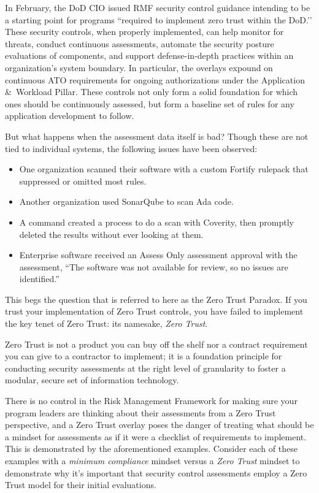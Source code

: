In February, the DoD CIO issued RMF security control guidance intending to be a starting point for programs ``required to implement zero trust within the DoD.’’\autocite[\pno~2]{20240610:cio} These security controls, when properly implemented, can help monitor for threats, conduct continuous assessments, automate the security posture evaluations of components, and support defense-in-depth practices within an organization's system boundary. In particular, the overlays expound on continuous ATO requirements for ongoing authorizations under the Application \&\ Workload Pillar. These controls not only form a solid foundation for which ones should be continuously assessed, but form a baseline set of rules for any application development to follow.

But what happens when the assessment data itself is bad? Though these are not tied to individual systems, the following issues have been observed:

\begin{itemize}
	\item One organization scanned their software with a custom Fortify rulepack that suppressed or omitted most rules.
	\item Another organization used SonarQube to scan Ada code.
	\item A command created a process to do a scan with Coverity, then promptly deleted the results without ever looking at them.
	\item Enterprise software received an Assess Only assessment approval with the assessment, ``The software was not available for review, so no issues are identified.''
\end{itemize}

This begs the question that is referred to here as the Zero Trust Paradox. If you trust your implementation of Zero Trust controls, you have failed to implement the key tenet of Zero Trust: its namesake, \textit{Zero Trust}.

Zero Trust is not a product you can buy off the shelf nor a contract requirement you can give to a contractor to implement; it is a foundation principle for conducting security assessments at the right level of granularity to foster a modular, secure set of information technology.\autocite{20240610:jackson}

There is no control in the Risk Management Framework for making sure your program leaders are thinking about their assessments from a Zero Trust perspective, and a Zero Trust overlay poses the danger of treating what should be a mindset for assessments as if it were a checklist of requirements to implement. This is demonstrated by the aforementioned examples. Consider each of these examples with a \textit{minimum compliance} mindset versus a \textit{Zero Trust} mindset to demonstrate why it's important that security control assessments employ a Zero Trust model for their initial evaluations.


